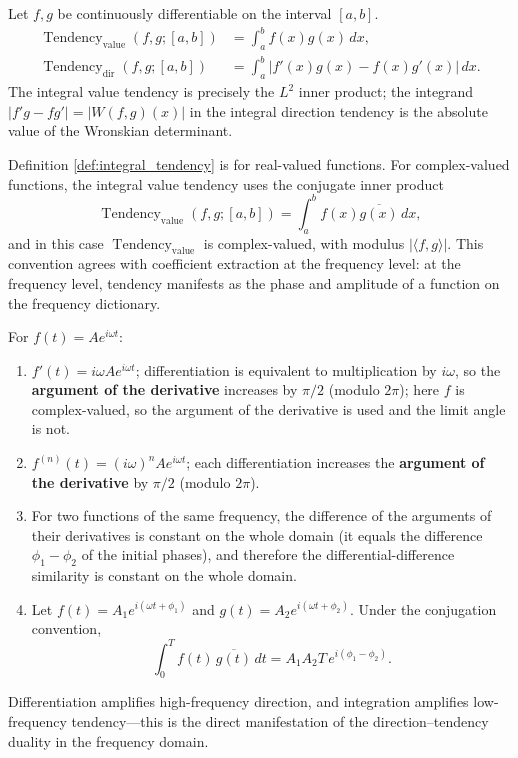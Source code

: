 \begin{definition}\label{def:integral_tendency}
Let $f, g$ be continuously differentiable on the interval $[a, b]$.
\begin{align*}
\operatorname{Tendency}_{\text{value}}(f, g; [a,b]) &= \int_a^b f(x)g(x)\,dx, \\
\operatorname{Tendency}_{\text{dir}}(f, g; [a,b]) &= \int_a^b |f'(x) g(x) - f(x) g'(x)|\,dx.
\end{align*}
The integral value tendency is precisely the $L^2$ inner product; the integrand $|f'g - fg'| = |W(f,g)(x)|$ in the integral direction tendency is the absolute value of the Wronskian determinant.
\end{definition}

\begin{remark}\label{rem:complex_tendency_conjugate}
Definition \ref{def:integral_tendency} is for real-valued functions. For complex-valued functions, the integral value tendency uses the conjugate inner product
\[
\operatorname{Tendency}_{\text{value}}(f, g; [a,b]) = \int_a^b f(x)\overline{g(x)}\,dx,
\]
and in this case $\operatorname{Tendency}_{\text{value}}$ is complex-valued, with modulus $|\langle f, g\rangle|$. This convention agrees with coefficient extraction at the frequency level: at the frequency level, tendency manifests as the phase and amplitude of a function on the frequency dictionary.
\end{remark}

\begin{example}\label{ex:harmonic_similarity}
For $f(t) = A e^{i\omega t}$:
\begin{enumerate}[label=(\roman*)]
    \item $f'(t) = i\omega A e^{i\omega t}$; differentiation is equivalent to multiplication by $i\omega$, so the \textbf{argument of the derivative} increases by $\pi/2$ (modulo $2\pi$); here $f$ is complex-valued, so the argument of the derivative is used and the limit angle is not.
    \item $f^{(n)}(t) = (i\omega)^n A e^{i\omega t}$; each differentiation increases the \textbf{argument of the derivative} by $\pi/2$ (modulo $2\pi$).
    \item For two functions of the same frequency, the difference of the arguments of their derivatives is constant on the whole domain (it equals the difference $\phi_1 - \phi_2$ of the initial phases), and therefore the differential-difference similarity is constant on the whole domain.
    \item Let $f(t) = A_1 e^{i(\omega t + \phi_1)}$ and $g(t) = A_2 e^{i(\omega t + \phi_2)}$. Under the conjugation convention,
    \[
    \int_0^T f(t)\,\overline{g(t)}\,dt = A_1 A_2 T\, e^{i(\phi_1 - \phi_2)}.
    \]
\end{enumerate}
Differentiation amplifies high-frequency direction, and integration amplifies low-frequency tendency---this is the direct manifestation of the direction--tendency duality in the frequency domain.
\end{example}

